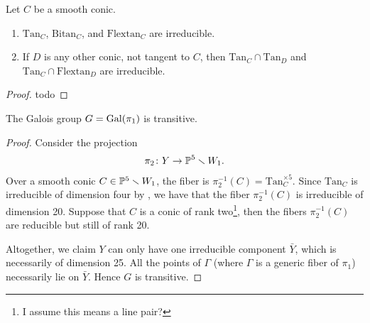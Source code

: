 \documentclass[11pt]{amsart}
\providecommand{\Bitan}{\mathrm{Bitan}}
\providecommand{\Flextan}{\mathrm{Flextan}}
\providecommand{\Tan}{\mathrm{Tan}}
\begin{document}
\begin{proposition} 
\label{prop:irreducibility-conic-loci}
Let $C$ be a smooth conic.
\begin{enumerate}
    \item $\Tan_C$, $\Bitan_C$, and $\Flextan_C$ are irreducible.
    \item If $D$ is any other conic, not tangent to $C$, then $\Tan_C \cap \Tan_D$ and $\Tan_C \cap \Flextan_D$ are irreducible.
\end{enumerate}
\end{proposition}
\begin{proof}
todo
\end{proof}

\begin{proposition} The Galois group $G = \mathrm{Gal}(\pi_1)$ is transitive.
\end{proposition}
\begin{proof} Consider the projection
\begin{align*}
    \pi_2 \colon Y \to \mathbb{P}^5 \smallsetminus W_1.
\end{align*}
Over a smooth conic $C \in \mathbb{P}^5 \smallsetminus W_1$, the fiber is $\pi_2^{-1}(C) = \Tan_C^{\times5}$. Since $\Tan_C$ is irreducible of dimension four by , we have that the fiber $\pi_2^{-1}(C)$ is irreducible of dimension 20. Suppose that $C$ is a conic of rank two\footnote{I assume this means a line pair?}, then the fibers $\pi_2^{-1}(C)$ are reducible but still of rank 20.

Altogether, we claim $Y$ can only have one irreducible component $\bar{Y}$, which is necessarily of dimension 25. All the points of $\Gamma$ (where $\Gamma$ is a generic fiber of $\pi_1$) necessarily lie on $\bar{Y}$. Hence $G$ is transitive.
\end{proof}
\end{document}
